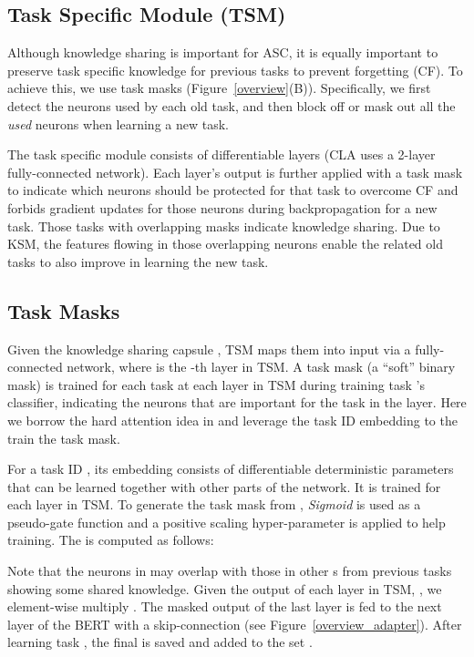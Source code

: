 \documentclass[11pt]{article}
\begin{document}
\subsection{Task Specific Module (TSM)} 
Although knowledge sharing is important for ASC, it is equally important to preserve task specific knowledge for previous tasks to prevent forgetting (CF). To achieve this, we use task masks (Figure~\ref{overview}(B)). Specifically, we first detect the neurons used by each old task, and then block off or mask out all the \textit{used} neurons when learning a new task. 

The task specific module consists of differentiable layers (CLA uses a 2-layer fully-connected network).
Each layer's output is further applied with a task mask to indicate which neurons should be protected for that task to overcome CF and forbids gradient updates for those neurons during backpropagation for a new task. 
Those tasks with overlapping masks indicate knowledge sharing. Due to KSM, the features flowing in those overlapping neurons enable the related old tasks to also improve in learning the new task.  

\subsection{Task Masks}
Given the knowledge sharing capsule , TSM maps them into input  via a fully-connected network, where  is the -th layer in TSM. 
A task mask (a ``soft'' binary mask)  is trained for each task  at each layer  in TSM during training task 's classifier, indicating the neurons that are important for the task in the layer. Here we borrow the hard attention idea in \cite{Serra2018overcoming} and leverage the task ID embedding to the train the task mask.

For a task ID , its embedding  consists of differentiable deterministic parameters that can be learned together with other parts of the network. 
It is trained for each layer in TSM.
To generate the task mask  from , \textit{Sigmoid} is used as a pseudo-gate function and a positive scaling hyper-parameter  is applied to help training. The  is computed as follows:
\vspace{-1.5mm}

Note that the neurons in  may overlap with those in other s from previous tasks showing some shared knowledge. Given the output of each layer in TSM, , we element-wise multiply . The masked output of the last layer  is fed to the next layer of the BERT with a skip-connection (see Figure~\ref{overview_adapter}). After learning task , the final  is saved and added to the set . 
\end{document}
